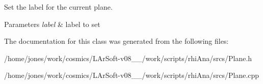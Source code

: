 Set the label for the current plane. 


\begin{DoxyParams}{Parameters}
{\em label} & label to set \\
\hline
\end{DoxyParams}


The documentation for this class was generated from the following files\-:\begin{DoxyCompactItemize}
\item 
/home/jones/work/cosmics/\-L\-Ar\-Soft-\/v08\-\_\-\_/work/scripts/rhi\-Ana/srcs/Plane.\-h\item 
/home/jones/work/cosmics/\-L\-Ar\-Soft-\/v08\-\_\-\_/work/scripts/rhi\-Ana/srcs/Plane.\-cpp\end{DoxyCompactItemize}
